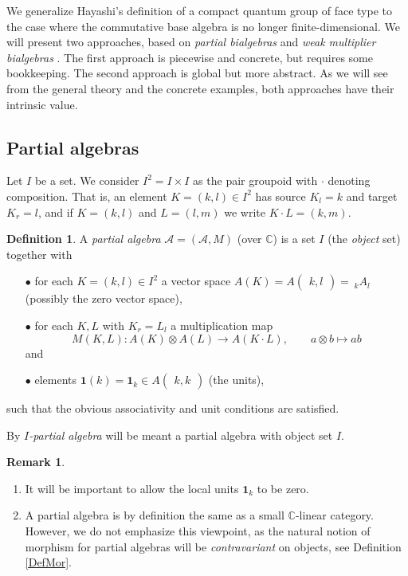 \documentclass[11pt]{article}
\newcommand{\C}{\mathbb{C}}
\newcommand{\Grs}[3]{#1{\begin{pmatrix} #2,  #3\end{pmatrix}}}
\newcommand{\GrDA}[3]{{}_{\;#2}#1_{#3}} %
\newcommand{\Unit}{\mathbf{1}}
\newcommand{\wmult}{\cdot}
\theoremstyle{definition}
\newtheorem{Def}[Theorem]{Definition}
\newtheorem{Rem}[Theorem]{Remark}
\numberwithin{equation}{section}
\begin{document}
We generalize Hayashi's definition of a compact quantum group of face type \cite{Hay1} to the case where the commutative base algebra is no longer finite-dimensional. We will present two approaches, based on \emph{partial bialgebras} and \emph{weak multiplier bialgebras} \cite{Boh1,VDW1}. The first approach is piecewise and concrete, but requires some bookkeeping. The second approach is global but more abstract. As we will see from the general theory and the concrete examples, both approaches have their intrinsic value.

\subsection{Partial algebras}

Let $I$ be a set. We consider $I^2=I\times I$ as the pair groupoid with $\wmult$ denoting composition. That is, an element $K=(k,l)\in I^2$ has source $K_l = k$ and target $K_r=l$, and if $K=(k,l)$ and $L=(l,m)$ we write $K\wmult L = (k,m)$. 

\begin{Def} A \emph{partial algebra} $\mathscr{A}=(\mathscr{A},M)$ (over $\C$) is a set $I$ (the \emph{object} set) together with 
\begin{itemize}
\item[$\bullet$] for each $K=(k,l)\in I^2$ a vector space $A(K) = \Grs{A}{k}{l}=\!\!\GrDA{A}{k}{l}$ (possibly the zero vector space),
\item[$\bullet$] for each $K,L$ with $K_r = L_l$ a multiplication map \[M(K,L):A(K) \otimes A(L)\rightarrow A(K\cdot L),\qquad a\otimes b \mapsto ab\]  and 
\item[$\bullet$] elements $\Unit(k) = \Unit_k \in \Grs{A}{k}{k}$ (the units), %
\end{itemize}
such that the obvious associativity and unit conditions are satisfied. 

By \emph{$I$-partial algebra} will be meant a partial algebra with object set $I$.
\end{Def}

\begin{Rem}
\begin{enumerate}\item It will be important to allow the local units $\Unit_k$ to be zero.
\item A partial algebra is by definition the same as a small $\C$-linear category. However, we do not emphasize this viewpoint, as the natural notion of morphism for partial algebras will be \emph{contravariant} on objects, see Definition \ref{DefMor}.%
\end{enumerate}
\end{Rem}
\end{document}
